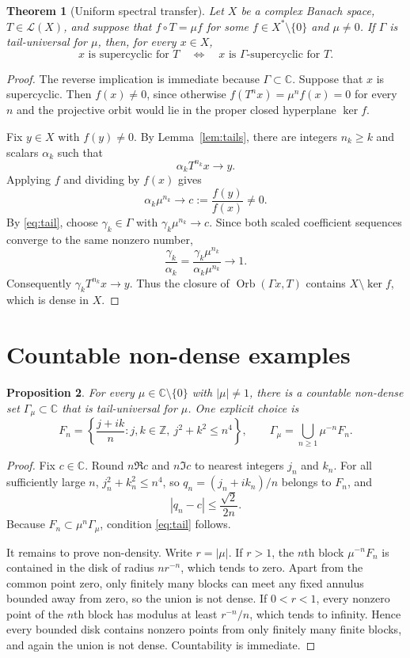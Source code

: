 \documentclass[11pt]{article}
\newtheorem{theorem}{Theorem}
\newtheorem{proposition}[theorem]{Proposition}
\theoremstyle{definition}
\newcommand{\C}{\mathbb C}
\newcommand{\Orb}{\operatorname{Orb}}
\begin{document}
\begin{theorem}[Uniform spectral transfer]\label{thm:transfer}
Let $X$ be a complex Banach space, $T\in\mathcal L(X)$, and suppose that
$f\circ T=\mu f$ for some $f\in X^*\setminus\{0\}$ and
$\mu\ne0$. If $\Gamma$ is tail-universal for $\mu$, then, for
every $x\in X$,
\[
 x\text{ is supercyclic for }T
 \quad\Longleftrightarrow\quad
 x\text{ is $\Gamma$-supercyclic for }T.
\]
\end{theorem}

\begin{proof}
The reverse implication is immediate because $\Gamma\subset\C$. Suppose
that $x$ is supercyclic. Then $f(x)\ne0$, since otherwise
$f(T^n x)=\mu^n f(x)=0$ for every $n$ and the projective orbit would lie
in the proper closed hyperplane $\ker f$.

Fix $y\in X$ with $f(y)\ne0$. By Lemma~\ref{lem:tails}, there are integers
$n_k\geq k$ and scalars $\alpha_k$ such that
\[
  \alpha_kT^{n_k}x\longrightarrow y.
\]
Applying $f$ and dividing by $f(x)$ gives
\[
  \alpha_k\mu^{n_k}\longrightarrow
  c:=\frac{f(y)}{f(x)}\ne0.
\]
By \eqref{eq:tail}, choose $\gamma_k\in\Gamma$ with
$\gamma_k\mu^{n_k}\to c$. Since both scaled coefficient sequences
converge to the same nonzero number,
\[
 \frac{\gamma_k}{\alpha_k}
 =\frac{\gamma_k\mu^{n_k}}{\alpha_k\mu^{n_k}}
 \longrightarrow1.
\]
Consequently $\gamma_kT^{n_k}x\to y$. Thus the closure of
$\Orb(\Gamma x,T)$ contains $X\setminus\ker f$, which is dense in $X$.
\end{proof}

\section{Countable non-dense examples}

\begin{proposition}\label{prop:lattice}
For every $\mu\in\C\setminus\{0\}$ with $|\mu|\ne1$, there is
a countable non-dense set $\Gamma_\mu\subset\C$ that is
tail-universal for $\mu$. One explicit choice is
\[
 F_n=\left\{\frac{j+ik}{n}:j,k\in\mathbb Z,\ j^2+k^2\leq n^4\right\},
 \qquad
 \Gamma_\mu=\bigcup_{n\geq1}\mu^{-n}F_n.
\]
\end{proposition}

\begin{proof}
Fix $c\in\C$. Round $n\Re c$ and $n\Im c$ to nearest integers $j_n$ and
$k_n$. For all sufficiently large $n$,
$j_n^2+k_n^2\leq n^4$, so
$q_n=(j_n+ik_n)/n$ belongs to $F_n$, and
\[
 |q_n-c|\leq\frac{\sqrt2}{2n}.
\]
Because $F_n\subset\mu^n\Gamma_\mu$, condition
\eqref{eq:tail} follows.

It remains to prove non-density. Write $r=|\mu|$. If $r>1$, the
$n$th block $\mu^{-n}F_n$ is contained in the disk of radius
$nr^{-n}$, which tends to zero. Apart from the common point zero, only
finitely many blocks can meet any fixed annulus bounded away from zero, so
the union is not dense. If $0<r<1$, every nonzero point of the $n$th block
has modulus at least $r^{-n}/n$, which tends to infinity. Hence every
bounded disk contains nonzero points from only finitely many finite blocks,
and again the union is not dense. Countability is immediate.
\end{proof}
\end{document}

